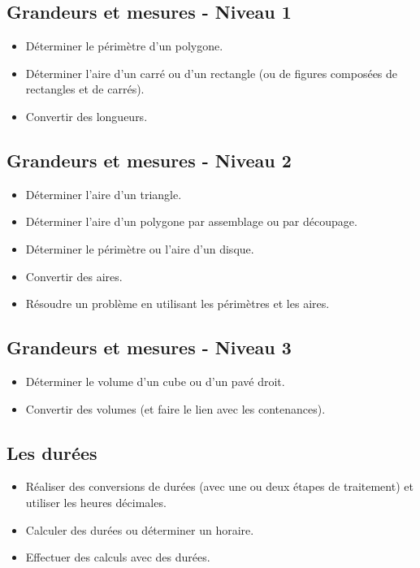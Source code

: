 \documentclass[a4paper,12pt,fleqn]{article}
\begin{document}
\renewcommand{\labelitemi}{}

\subsection*{Grandeurs et mesures - Niveau 1}

\begin{itemize}
	\item {}Déterminer le périmètre d’un polygone.
	\item {}Déterminer l’aire d’un carré ou d’un rectangle (ou de figures composées de rectangles et de carrés).
	\item {}Convertir des longueurs.
\end{itemize}

\subsection*{Grandeurs et mesures - Niveau 2}

\begin{itemize}
	\item {}Déterminer l’aire d’un triangle. %
	\item {}Déterminer l’aire d’un polygone par assemblage ou par découpage.
	\item {}Déterminer le périmètre ou l’aire d’un disque.
	\item {}Convertir des aires.
	\item {}Résoudre un problème en utilisant les périmètres et les aires.

\end{itemize}

\subsection*{Grandeurs et mesures - Niveau 3}

\begin{itemize}
	\item {}Déterminer le volume d’un cube ou d'un pavé droit.
	\item {}Convertir des volumes (et faire le lien avec les contenances). %
\end{itemize}

\subsection*{Les durées}

\begin{itemize}
	\item {}Réaliser des conversions de durées (avec une ou deux étapes de traitement) et utiliser les heures décimales. %
	\item {}Calculer des durées ou déterminer un horaire.
	\item {}Effectuer des calculs avec des durées.
\end{itemize}
\end{document}
